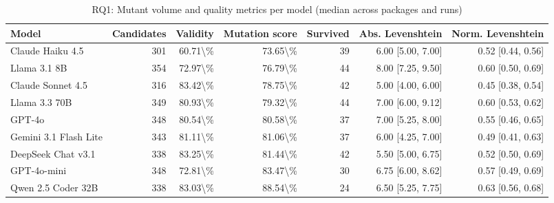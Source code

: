 \begin{table}[htbp]
\centering
{\small
\begin{tabular}{l|rrrrrr}
\toprule
\textbf{Model} & \textbf{Candidates} & \textbf{Validity} & \textbf{Mutation score} & \textbf{Survived} & \textbf{Abs. Levenshtein} & \textbf{Norm. Levenshtein} \\
\midrule
Claude Haiku 4.5 & 301 & 60.71\textbackslash{}\% & 73.65\textbackslash{}\% & 39 & 6.00 [5.00, 7.00] & 0.52 [0.44, 0.56] \\
Llama 3.1 8B & 354 & 72.97\textbackslash{}\% & 76.79\textbackslash{}\% & 44 & 8.00 [7.25, 9.50] & 0.60 [0.50, 0.69] \\
Claude Sonnet 4.5 & 316 & 83.42\textbackslash{}\% & 78.75\textbackslash{}\% & 42 & 5.00 [4.00, 6.00] & 0.45 [0.38, 0.54] \\
Llama 3.3 70B & 349 & 80.93\textbackslash{}\% & 79.32\textbackslash{}\% & 44 & 7.00 [6.00, 9.12] & 0.60 [0.53, 0.62] \\
GPT-4o & 348 & 80.54\textbackslash{}\% & 80.58\textbackslash{}\% & 37 & 7.00 [5.25, 8.00] & 0.55 [0.46, 0.65] \\
Gemini 3.1 Flash Lite & 343 & 81.11\textbackslash{}\% & 81.06\textbackslash{}\% & 37 & 6.00 [4.25, 7.00] & 0.49 [0.41, 0.63] \\
DeepSeek Chat v3.1 & 338 & 83.25\textbackslash{}\% & 81.44\textbackslash{}\% & 42 & 5.50 [5.00, 6.75] & 0.52 [0.50, 0.69] \\
GPT-4o-mini & 348 & 72.81\textbackslash{}\% & 83.47\textbackslash{}\% & 30 & 6.75 [6.00, 8.62] & 0.57 [0.49, 0.69] \\
Qwen 2.5 Coder 32B & 338 & 83.03\textbackslash{}\% & 88.54\textbackslash{}\% & 24 & 6.50 [5.25, 7.75] & 0.63 [0.56, 0.68] \\
\bottomrule
\end{tabular}
}
\caption{RQ1: Mutant volume and quality metrics per model (median across packages and runs)}
\label{tab:rq1-volume}
\end{table}